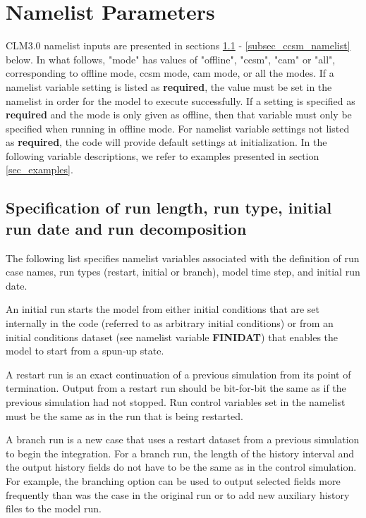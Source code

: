 \section{Namelist Parameters}
\label{sec_namelist}

CLM3.0 namelist inputs are presented in sections
\ref{subsec_run} - \ref{subsec_ccsm_namelist} below.  In what follows,
"mode" has values of "offline", "ccsm", "cam" or "all", corresponding
to offline mode, ccsm mode, cam mode, or all the modes.  If a namelist
variable setting is listed as {\bf required}, the value must be set in
the namelist in order for the model to execute successfully.  If a
setting is specified as {\bf required} and the mode is only given as
offline, then that variable must only be specified when running in
offline mode.  For namelist variable settings not listed as {\bf
required}, the code will provide default settings at initialization.
In the following variable descriptions, we refer to examples presented
in section \ref{sec_examples}.

\subsection {Specification of run length, run type, initial run date and run decomposition}
\label{subsec_run}

The following list specifies namelist variables associated with the
definition of run case names, run types (restart, initial or branch),
model time step, and initial run date. 

An initial run starts the model from either initial conditions that
are set internally in the code (referred to as arbitrary initial
conditions) or from an initial conditions dataset (see namelist
variable {\bf FINIDAT}) that enables the model to start from a spun-up
state. 

A restart run is an exact continuation of a previous simulation from
its point of termination.  Output from a restart run should be
bit-for-bit the same as if the previous simulation had not
stopped. Run control variables set in the namelist must be the same as
in the run that is being restarted. 

A branch run is a new case that uses a restart dataset from a previous
simulation to begin the integration. For a branch run, the length of
the history interval and the output history fields do not have to be
the same as in the control simulation. For example, the branching
option can be used to output selected fields more frequently than was
the case in the original run or to add new auxiliary history files to
the model run.

